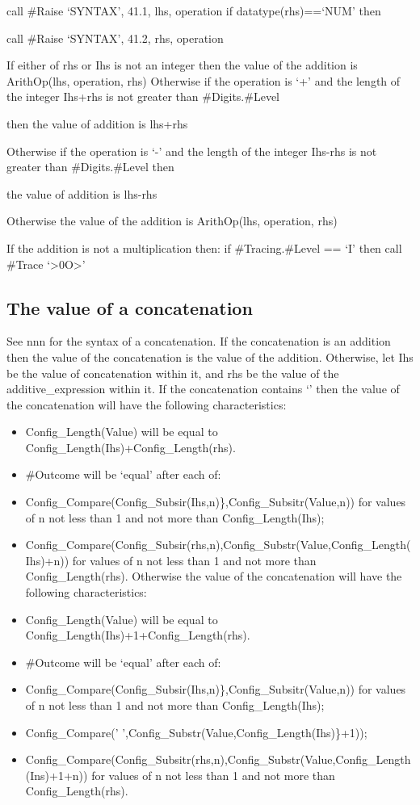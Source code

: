 call \#Raise `SYNTAX', 41.1, lhs, operation if datatype(rhs)==`NUM' then

call \#Raise `SYNTAX', 41.2, rhs, operation

If either of rhs or Ihs is not an integer then the value of the addition
is ArithOp(lhs, operation, rhs) Otherwise if the operation is `+' and
the length of the integer Ihs+rhs is not greater than \#Digits.\#Level

then the value of addition is lhs+rhs

Otherwise if the operation is `-' and the length of the integer Ihs-rhs
is not greater than \#Digits.\#Level then

the value of addition is lhs-rhs

Otherwise the value of the addition is ArithOp(lhs, operation, rhs)

If the addition is not a multiplication then: if \#Tracing.\#Level ==
`I' then call \#Trace `\textgreater0O\textgreater{}'

\subsection{The value of a
concatenation}\label{the-value-of-a-concatenation}

See nnn for the syntax of a concatenation. If the concatenation is an
addition then the value of the concatenation is the value of the
addition. Otherwise, let Ihs be the value of concatenation within it,
and rhs be the value of the additive\_expression within it. If the
concatenation contains `\textbar\textbar{}' then the value of the
concatenation will have the following characteristics:

\begin{itemize}
\item
  Config\_Length(Value) will be equal to
  Config\_Length(Ihs)+Config\_Length(rhs).
\item
  \#Outcome will be `equal' after each of:
\item
  Config\_Compare(Config\_Subsir(Ihs,n)\},Config\_Subsitr(Value,n)) for
  values of n not less than 1 and not more than Config\_Length(Ihs);
\item
  Config\_Compare(Config\_Subsir(rhs,n),Config\_Substr(Value,Config\_Length(Ihs)+n))
  for values of n not less than 1 and not more than Config\_Length(rhs).
  Otherwise the value of the concatenation will have the following
  characteristics:
\item
  Config\_Length(Value) will be equal to
  Config\_Length(Ihs)+1+Config\_Length(rhs).
\item
  \#Outcome will be `equal' after each of:
\item
  Config\_Compare(Config\_Subsir(Ihs,n)\},Config\_Subsitr(Value,n)) for
  values of n not less than 1 and not more than Config\_Length(Ihs);
\item
  Config\_Compare(' ',Config\_Substr(Value,Config\_Length(Ihs)\}+1));
\item
  Config\_Compare(Config\_Subsitr(rhs,n),Config\_Substr(Value,Config\_Length(Ins)+1+n))
  for values of n not less than 1 and not more than Config\_Length(rhs).
\end{itemize}


